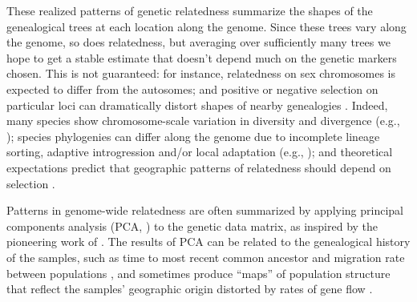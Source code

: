 \documentclass[11pt, oneside]{article}   	%
\newcommand\citet{\cite}
\newcommand\citep{\cite}
\renewcommand{\revpoint}[2]{\relax}
\begin{document}
These realized patterns of genetic relatedness
summarize the shapes of the genealogical trees %
at each location along the genome.
Since these trees vary along the genome, so does relatedness,
but averaging over sufficiently many trees we hope to get a stable estimate
that doesn't depend much on the genetic markers chosen.
This is not guaranteed:
for instance,
relatedness on sex chromosomes is expected to differ from the autosomes;
and positive or negative selection on particular loci can dramatically distort shapes of nearby genealogies
\citep{kim2002hitchhiking,charlesworth1993effect,barton2000genetic}.
Indeed,
many species show chromosome-scale variation in diversity and divergence
(e.g., \citet{langley2012genomic});
species phylogenies can differ along the genome 
due to incomplete lineage sorting,
adaptive introgression and/or local adaptation 
(e.g., \citet{pease2013accurate,ellegren2012genomic,nadeau2012genomic,pool2015natural,vernot2014resurrecting});
and theoretical expectations predict that geographic patterns of relatedness should depend on selection
\citep{charlesworth2003review}.

Patterns in genome-wide relatedness are often summarized
by applying principal components analysis (PCA, \citet{patterson2006population}) 
to the genetic data matrix,
as inspired by the pioneering work of \citet{menozzi1978synthetic}. \revpoint{AE}{3}
The results of PCA can be related to the genealogical history of the samples, 
such as time to most recent common ancestor and migration rate between populations \citep{novembre2008interpreting,mcvean2009genealogical}, 
and sometimes produce ``maps'' of population structure
that reflect the samples' geographic origin distorted by rates of gene flow
\citep{novembre2008genes}.
\end{document}
